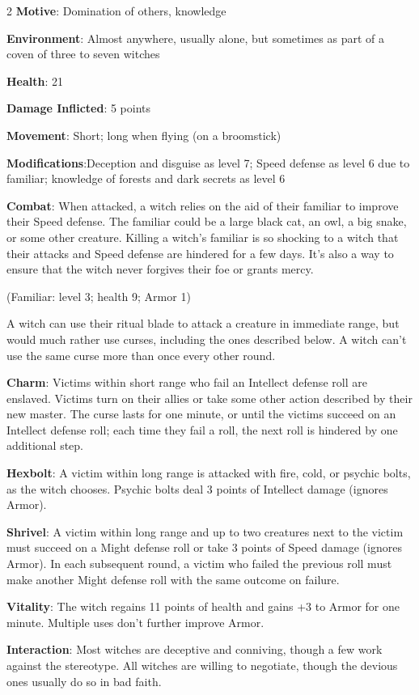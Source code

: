 \begin{multicols}{2}
\textbf{Motive}: Domination of others, knowledge

\textbf{Environment}: Almost anywhere, usually alone, but sometimes as part of a coven of three to seven witches 

\textbf{Health}: 21

\textbf{Damage Inflicted}: 5 points

\textbf{Movement}: Short; long when flying (on a broomstick)

\textbf{Modifications}:Deception and disguise as level 7; Speed defense as level 6 due to familiar; knowledge of forests and dark secrets as level 6

\textbf{Combat}: When attacked, a witch relies on the aid of their familiar to improve their Speed defense. The familiar could be a large black cat, an owl, a big snake, or some other creature. Killing a witch’s familiar is so shocking to a witch that their attacks and Speed defense are hindered for a few days. It’s also a way to ensure that the witch never forgives their foe or grants mercy.

(Familiar: level 3; health 9; Armor 1)

A witch can use their ritual blade to attack a creature in immediate range, but would much rather use curses, including the ones described below. A witch can’t use the same curse more than once every other round.

\textbf{Charm}: Victims within short range who fail an Intellect defense roll are enslaved. Victims turn on their allies or take some other action described by their new master. The curse lasts for one minute, or until the victims succeed on an Intellect defense roll; each time they fail a roll, the next roll is hindered by one additional step.

\textbf{Hexbolt}: A victim within long range is attacked with fire, cold, or psychic
bolts, as the witch chooses. Psychic bolts deal 3 points of Intellect damage (ignores Armor).

\textbf{Shrivel}: A victim within long range and up to two creatures next to the victim must succeed on a Might defense roll or take 3 points of Speed damage (ignores Armor). In each subsequent round, a victim who failed the previous roll must make another Might defense roll with the same outcome on failure.

\textbf{Vitality}: The witch regains 11 points of health and gains +3 to Armor for one minute. Multiple uses don’t further improve Armor.

\textbf{Interaction}: Most witches are deceptive and conniving, though a few work against the stereotype. All witches are willing to negotiate, though the devious ones usually do so in bad faith.


\end{multicols}
